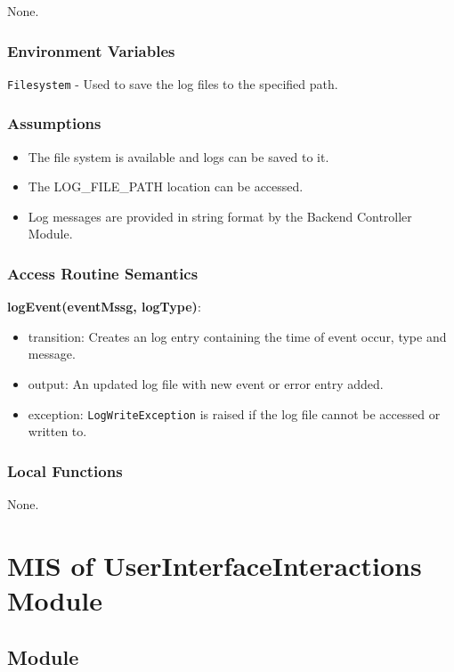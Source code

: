 \documentclass[12pt, titlepage]{article}
\begin{document}
None.

\subsubsection{Environment Variables}
\texttt{Filesystem} - Used to save the log files to the specified path.

\subsubsection{Assumptions}
\begin{itemize}
  \item The file system is available and logs can be saved to it.
  \item The LOG\_FILE\_PATH location can be accessed.
  \item Log messages are provided in string format by the Backend
    Controller Module.
\end{itemize}
\subsubsection{Access Routine Semantics}

\noindent \textbf{logEvent(eventMssg, logType)}:
\begin{itemize}
  \item transition: Creates an log entry containing the time of event
    occur, type and message.
  \item output: An updated log file with new event or error entry added.
  \item exception: \texttt{LogWriteException} is raised if the log
    file cannot be accessed or written to.
\end{itemize}

\subsubsection{Local Functions}

None.

\section{MIS of UserInterfaceInteractions Module}\label{UI_Interactions}

\subsection{Module}
\end{document}

